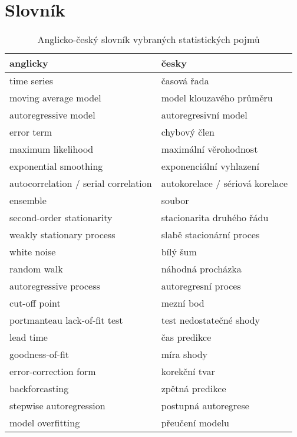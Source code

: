 \chapter{Slovník}

\begin{table}
\begin{center}
\begin{tabular}{l l} 
\bf{anglicky} & \bf{česky}\\
\hline
time series & časová řada\\
moving average model & model klouzavého průměru\\
autoregressive model & autoregresivní model\\
error term & chybový člen\\
maximum likelihood & maximální věrohodnost\\
exponential smoothing & exponenciální vyhlazení\\
autocorrelation / serial correlation & autokorelace / sériová korelace\\
ensemble & soubor\\
second-order stationarity & stacionarita druhého řádu\\
weakly stationary process & slabě stacionární proces\\
white noise & bílý šum\\
random walk & náhodná procházka\\
autoregressive process & autoregresní proces\\
cut-off point & mezní bod\\
portmanteau lack-of-fit test & test nedostatečné shody\\
lead time & čas predikce\\
goodness-of-fit & míra shody\\
error-correction form & korekční tvar\\
backforcasting & zpětná predikce\\
stepwise autoregression & postupná autoregrese\\
model overfitting & přeučení modelu\\
\end{tabular}
\caption{Anglicko-český slovník vybraných statistických pojmů}
\end{center}
\end{table}